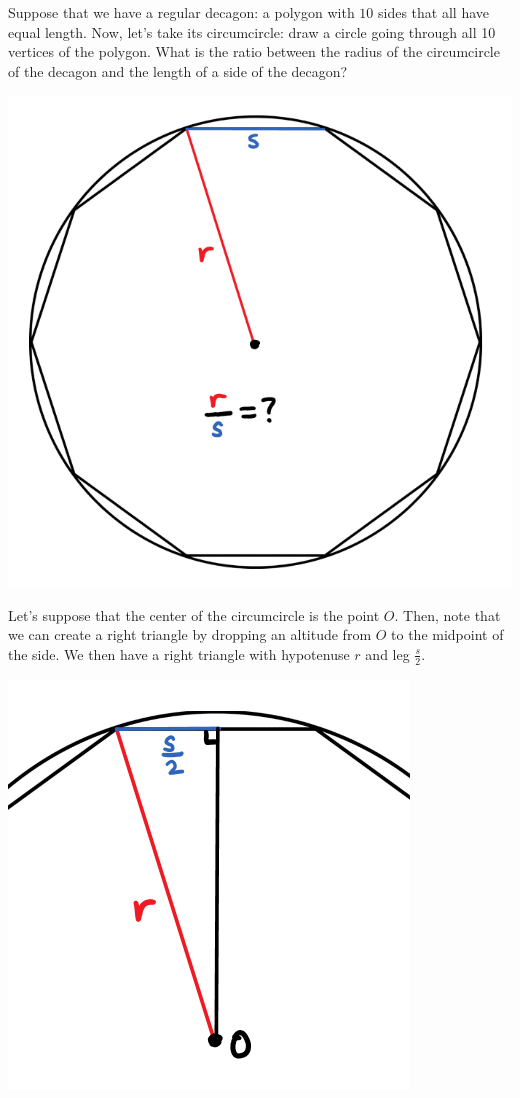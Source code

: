 \documentclass{article}
\begin{document}
Suppose that we have a regular decagon: a polygon with $10$ sides that all have equal length. Now, let’s take its circumcircle: draw a circle going through all 10 vertices of the polygon. What is the ratio between the radius of the circumcircle of the decagon and the length of a side of the decagon?

\begin{center}
    \includegraphics[scale=0.25]{images/golden-ratio3.png}
\end{center}

Let’s suppose that the center of the circumcircle is the point $O$. Then, note that we can create a right triangle by dropping an altitude from $O$ to the midpoint of the side. We then have a right triangle with hypotenuse $r$ and leg $\frac s2$.

\begin{center}
   \includegraphics[scale=0.35]{images/golden-ratio4.png}
\end{center}
\end{document}
